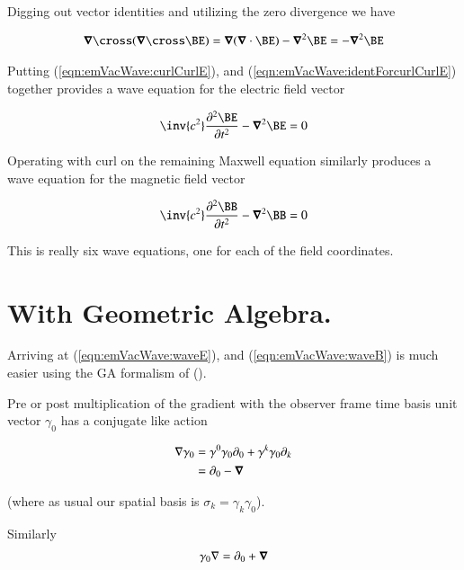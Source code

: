 Digging out vector identities and utilizing the zero divergence we have

\begin{align}\label{eqn:emVacWave:identForcurlCurlE}
\spacegrad \cross (\spacegrad \cross \BE) = \spacegrad (\spacegrad \cdot \BE) - \spacegrad^2 \BE = -\spacegrad^2 \BE
\end{align}

Putting (\ref{eqn:emVacWave:curlCurlE}), and (\ref{eqn:emVacWave:identForcurlCurlE}) together provides a wave equation for the electric field vector

\begin{align}\label{eqn:emVacWave:waveE}
\inv{c^2} \frac{\partial^2 \BE}{\partial t^2} - \spacegrad^2 \BE = 0
\end{align}

Operating with curl on the remaining Maxwell equation similarly produces a wave equation for the magnetic field vector

\begin{align}\label{eqn:emVacWave:waveB}
\inv{c^2} \frac{\partial^2 \BB}{\partial t^2} - \spacegrad^2 \BB = 0
\end{align}

This is really six wave equations, one for each of the field coordinates.

\section{With Geometric Algebra.}

Arriving at (\ref{eqn:emVacWave:waveE}), and (\ref{eqn:emVacWave:waveB}) is much easier using the GA formalism of (\citep{doran2003gap}).

Pre or post multiplication of the gradient with the observer frame time basis unit vector $\gamma_0$ has a conjugate like
action

\begin{align*}
\nabla \gamma_0
&=
\gamma^0 \gamma_0 \partial_0 + \gamma^k \gamma_0 \partial_k \\
&=
\partial_0 - \boldsymbol{\nabla} \\
\end{align*}

(where as usual our spatial basis is $\sigma_k = \gamma_k \gamma_0$).

Similarly
\begin{align*}
\gamma_0 \nabla 
&=
\partial_0 + \boldsymbol{\nabla} \\
\end{align*}

